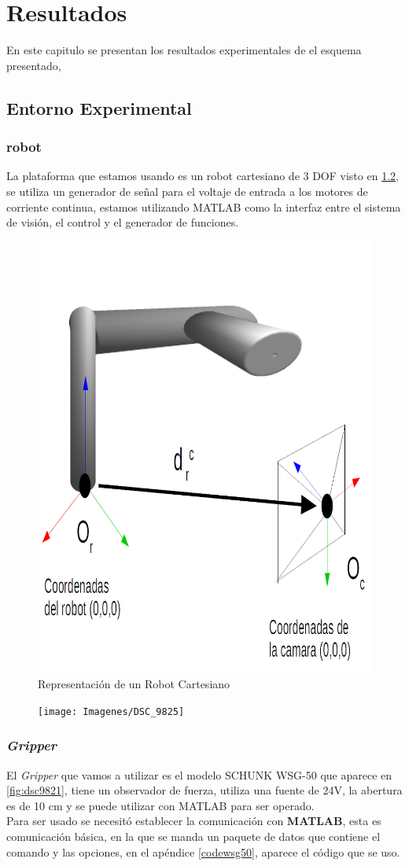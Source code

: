\chapter{Resultados}
En este capitulo se presentan los resultados experimentales de el esquema presentado, 


\section{Entorno Experimental}



\subsection{robot}
La plataforma que estamos usando es un robot cartesiano de 3 DOF visto en  \cref{fig:dsc9825}, se utiliza un generador de señal para el voltaje de entrada a los motores de corriente continua, estamos utilizando MATLAB como la interfaz entre el sistema de visión, el control y el generador de funciones.

\begin{figure}
	\centering
	\includegraphics[width=0.5\linewidth]{visio/visio3/coordenadasrobcam2}
	\caption{Representación de un Robot Cartesiano}
	\label{fig:coordenadasrobcam}
\end{figure}


\begin{figure}
	\centering
	\texttt{[image: Imagenes/DSC\_9825]}
	\caption{}
	\label{fig:dsc9825}
\end{figure}



\subsection{\textit{Gripper}}
El \textit{Gripper} que vamos a utilizar es el modelo SCHUNK WSG-50 que aparece en \cref{fig:dsc9821}, tiene un observador de fuerza, utiliza una fuente de 24V, la abertura es de 10 cm y se puede utilizar con MATLAB para ser operado. \\
Para ser usado se necesitó establecer la comunicación con \textbf{MATLAB}, esta es comunicación básica, en la que se manda un paquete de datos que contiene el comando y las opciones, en el apéndice \ref{codewsg50}, aparece el código que se uso.

